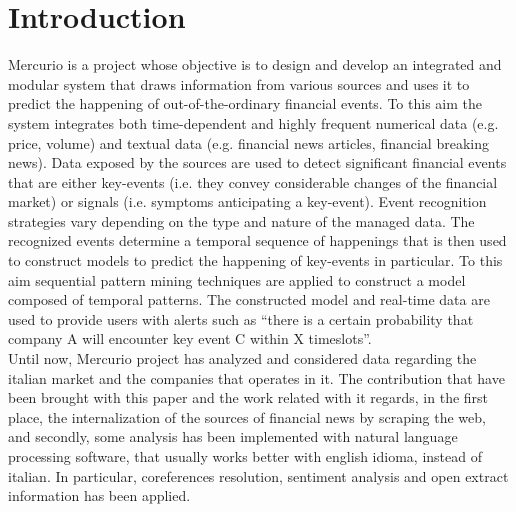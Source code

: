 \section{Introduction}
Mercurio is a project whose objective is to design and develop an integrated and modular system that draws information from various sources and uses it to predict the happening of out-of-the-ordinary financial events. To this aim the system integrates both time-dependent and highly frequent numerical data (e.g. price, volume) and textual data (e.g. financial news articles, financial breaking news).
Data exposed by the sources are used to detect significant financial events that are either key-events (i.e. they convey considerable changes of the financial market) or signals (i.e. symptoms anticipating a key-event). Event recognition strategies vary depending on the type and nature of the managed data. The recognized events determine a temporal sequence of happenings that is then used to construct models to predict the happening of key-events in particular. To this aim sequential pattern mining techniques are applied to construct a model composed of temporal patterns. The constructed model and real-time data are used to provide users with alerts such as “there is a certain probability that company A will encounter key event C within X timeslots”. \\
Until now, Mercurio project has analyzed and considered data regarding the italian market and the companies that operates in it. The contribution that have been brought with this paper and the work related with it regards, in the first place, the internalization of the sources of financial news by scraping the web, and secondly, some analysis has been implemented with natural language processing software, that usually works better with english idioma, instead of italian. In particular, coreferences resolution, sentiment analysis and open extract information has been applied. \\